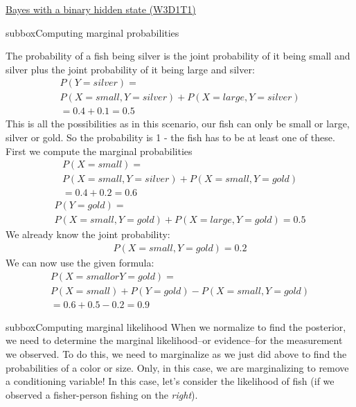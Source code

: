 \begin{textbox}{\href{https://compneuro.neuromatch.io/tutorials/W3D1_BayesianDecisions/student/W3D1_Tutorial1.html}{Bayes with a binary hidden state (W3D1T1)} }
\begin{subbox}{subbox}{Computing marginal probabilities}
\scriptsize

 The probability of a fish being silver is the joint probability of it being
     small and silver plus the joint probability of it being large and silver:
\begin{eqnarray*}
 P(Y = silver) =\\ 
 P(X = small, Y = silver) + P(X = large, Y = silver)\\
                  = 0.4 + 0.1
                  = 0.5
                  \end{eqnarray*} 
This is all the possibilities as in this scenario, our fish can only be small
   or large, silver or gold. So the probability is 1 - the fish has to be at
   least one of these.\\
 First we compute the marginal probabilities
\begin{align*} P(X = small) =\\ P(X = small, Y = silver) + P(X = small, Y = gold)\\ = 0.4+0.2=0.6\end{align*} 
\begin{align*}  P(Y = gold) = \\P(X = small, Y = gold) + P(X = large, Y = gold) = 0.5\end{align*} 
   We already know the joint probability: \begin{align*} P(X = small, Y = gold) = 0.2\end{align*} 
   We can now use the given formula:
\begin{align*}    P( X = small or Y = gold) = \\P(X = small) + P(Y = gold) - P(X = small, Y = gold)\\
                             = 0.6 + 0.5 - 0.2
                             = 0.9 \end{align*} 
                             
                    

\end{subbox}
\begin{subbox}{subbox}{Computing marginal likelihood}
\scriptsize
When we normalize to find the posterior, we need to determine the marginal likelihood--or evidence--for the measurement we observed. To do this, we need to marginalize as we just did above to find the probabilities of a color or size. Only, in this case, we are marginalizing to remove a conditioning variable! In this case, let's consider the likelihood of fish (if we observed a fisher-person fishing on the \textit{right}).


\end{subbox}
\end{textbox}

